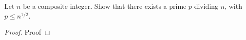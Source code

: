 \begin{statement}{1.2}
Let $n$ be a composite integer. Show that there exists a prime $p$
dividing $n$, with $p \le n^{1/2}$.
\end{statement}
\begin{proof}
  Proof 
\end{proof}
